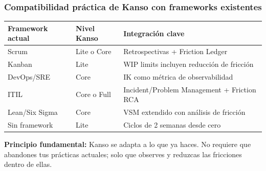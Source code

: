 \vspace{1em}

\subsubsection*{Compatibilidad práctica de Kanso con frameworks existentes}

\begin{table}[h]
\centering
\begin{tabular}{|l|l|p{5cm}|}
\hline
\textbf{Framework actual} & \textbf{Nivel Kanso} & \textbf{Integración clave} \\
\hline
Scrum & Lite o Core & Retrospectivas + Friction Ledger \\
\hline
Kanban & Lite & WIP limits incluyen reducción de fricción \\
\hline
DevOps/SRE & Core & IK como métrica de observabilidad \\
\hline
ITIL & Core o Full & Incident/Problem Management + Friction RCA \\
\hline
Lean/Six Sigma & Core & VSM extendido con análisis de fricción \\
\hline
Sin framework & Lite & Ciclos de 2 semanas desde cero \\
\hline
\end{tabular}
\end{table}

\textbf{Principio fundamental:} Kanso se adapta a lo que ya haces. No requiere que abandones 
tus prácticas actuales; solo que observes y reduzcas las fricciones dentro de ellas.
